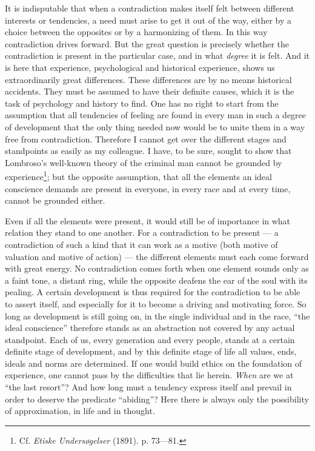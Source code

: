 \documentclass[12pt,a4paper,openany]{book}
\newcommand{\opage}[1]{\marginnote{\footnotesize\textit{[#1]}}}
\begin{document}
It is indisputable that when a contradiction makes itself felt between different interests or
tendencies, a need must arise to get it out of the way, either by a choice between the opposites or by a
harmonizing of them. In this way contradiction drives forward. But the great question is precisely
whether the contradiction is present in the particular case, and in what \textit{degree} it is felt. And
it is here that experience, psychological and historical experience, shows us extraordinarily great
differences. These differences are by no means historical accidents. They must be assumed to have their
definite causes, which it is the task of psychology and history to find. One has no right to start from
the assumption that all tendencies of feeling are found in every man in such a degree of development that
the only thing needed now would be to unite them in a way free from contradiction. Therefore I cannot get
over the different stages and standpoints as easily as my colleague. I have, to be sure, sought to show
that Lombroso's well-known theory of the criminal man cannot be grounded by
experience\footnote[1]{Cf. \textit{Etiske Undersøgelser} (1891). p. 73---81.};
\opage{77}but the opposite assumption, that all the elements an ideal conscience demands are present in
everyone, in every race and at every time, cannot be grounded either.

Even if all the elements were present, it would still be of importance in what relation they stand to
one another. For a contradiction to be present --- a contradiction of such a kind that it can work as a
motive (both motive of valuation and motive of action) --- the different elements must each come forward
with great energy. No contradiction comes forth when one element sounds only as a faint tone, a distant
ring, while the opposite deafens the ear of the soul with its pealing. A certain development is thus
required for the contradiction to be able to assert itself, and especially for it to become a driving
and motivating force. So long as development is still going on, in the single individual and in the
race, ``the ideal conscience'' therefore stands as an abstraction not covered by any actual standpoint.
Each of us, every generation and every people, stands at a certain definite stage of development, and by
this definite stage of life all values, ends, ideals and norms are determined. If one would build ethics
on the foundation of experience, one cannot pass by the difficulties that lie herein. \textit{When} are
we at ``the last resort''? And how long must a tendency express itself and prevail in order to deserve
the predicate ``abiding''? Here there is always only the possibility of approximation, in life and in
thought.
\end{document}
